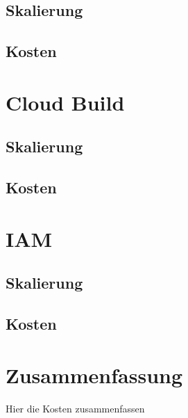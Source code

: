 \subsection{Skalierung}
\blindtext

\subsection{Kosten}
\sblindtext


\section{Cloud Build}
\blindtext

\subsection{Skalierung}
\blindtext

\subsection{Kosten}
\sblindtext


\section{IAM}
\blindtext

\subsection{Skalierung}
\blindtext

\subsection{Kosten}
\sblindtext



\section{Zusammenfassung}
Hier die Kosten zusammenfassen